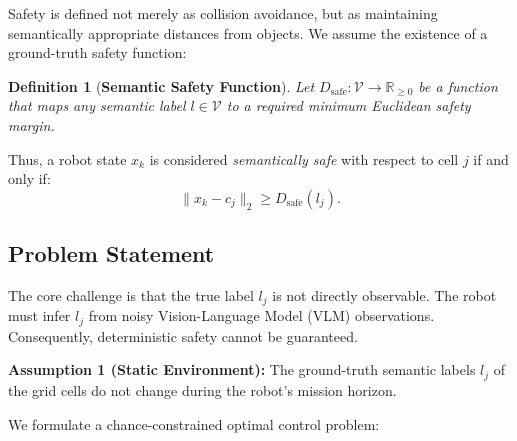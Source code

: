 \documentclass[letterpaper, 10 pt, conference]{ieeeconf}  %
\newtheorem{mydef}{\bf Definition}
\begin{document}
Safety is defined not merely as collision avoidance, but as maintaining semantically appropriate distances from objects. We assume the existence of a ground-truth safety function:
\begin{mydef}[\textbf{Semantic Safety Function}]
    Let $D_{\text{safe}}: \mathcal{V} \to \mathbb{R}_{\ge 0}$ be a function that maps any semantic label $l \in \mathcal{V}$ to a required minimum Euclidean safety margin.
\end{mydef}

Thus, a robot state $x_k$ is considered \textit{semantically safe} with respect to cell $j$ if and only if:
\begin{equation}
    \| x_k - c_j \|_2 \ge D_{\text{safe}}(l_j).
\end{equation}

\subsection{Problem Statement}
The core challenge is that the true label $l_j$ is not directly observable. The robot must infer $l_j$ from noisy Vision-Language Model (VLM) observations. Consequently, deterministic safety cannot be guaranteed.

\textbf{Assumption 1 (Static Environment):} The ground-truth semantic labels $l_j$ of the grid cells do not change during the robot's mission horizon.

We formulate a chance-constrained optimal control problem:
\end{document}
